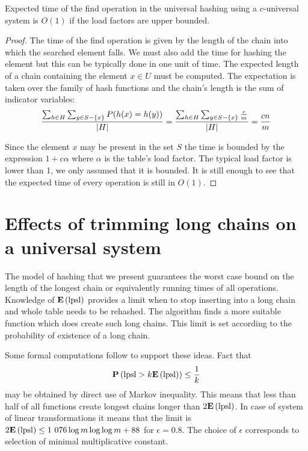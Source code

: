 \begin{theorem}
\label{theorem-expected-chain-length-universal}
Expected time of the find operation in the universal hashing using a $c$-universal system is $O(1)$ if the load factors are upper bounded.
\end{theorem}
\begin{proof}
The time of the find operation is given by the length of the chain into which the searched element falls. We must also add the time for hashing the element but this can be typically done in one unit of time. The expected length of a chain containing the element $x \in U$ must be computed. The expectation is taken over the family of hash functions and the chain's length is the sum of indicator variables:
\begin{displaymath}
\frac{\sum\displaylimits_{h \in H} \sum\displaylimits_{y \in S - \lbrace x \rbrace} P(h(x) = h(y))}{|H|} = \frac{\sum\displaylimits_{h \in H} \sum\displaylimits_{y \in S - \lbrace x \rbrace} \frac{c}{m}}{|H|} = \frac{cn}{m}
\end{displaymath}

Since the element $x$ may be present in the set $S$ the time is bounded by the expression $1 + c\alpha$ where $\alpha$ is the table's load factor. The typical load factor is lower than 1, we only assumed that it is bounded. It is still enough to see that the expected time of every operation is still in $O(1)$.
\end{proof}

\section{Effects of trimming long chains on a universal system}
The model of hashing that we present guarantees the worst case bound on the length of the longest chain or equivalently running times of all operations. Knowledge of $\mathbf{E}\left(\mathrm{lpsl}\right)$ provides a limit when to stop inserting into a long chain and whole table needs to be rehashed. The algorithm finds a more suitable function which does create such long chains. This limit is set according to the probability of existence of a long chain.

Some formal computations follow to support these ideas. Fact that \[ \mathbf{P}\left(\mathrm{lpsl} > k \mathbf{E}\left(\mathrm{lpsl}\right)\right) \leq \frac{1}{k} \] may be obtained by direct use of Markov inequality. This means that less than half of all functions create longest chains longer than $2 \mathbf{E}\left(\mathrm{lpsl}\right)$. In case of system of linear transformations it means that the limit is $2\mathbf{E}\left(\mathrm{lpsl}\right) \leq \text{1 076} \log m \log \log m + 88$ for $\epsilon = 0.8$. The choice of $\epsilon$ corresponds to selection of minimal multiplicative constant.

